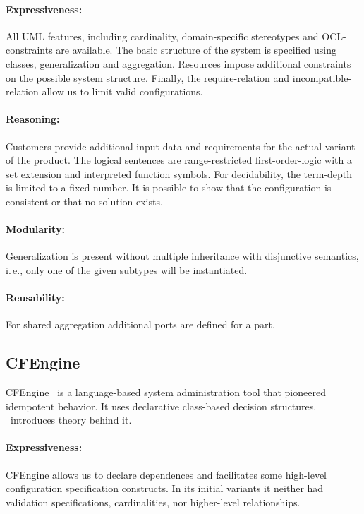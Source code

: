 \paragraph*{Expressiveness:}
All UML features, including cardinality, domain-specific stereotypes and OCL-constraints are available.
The basic structure of the system is specified using classes, generalization and aggregation.
Resources impose additional constraints on the possible system structure.
Finally, the require-relation and incompatible-relation allow us to limit valid configurations.

\paragraph*{Reasoning:}
Customers provide additional input data and requirements for the actual variant of the product.
The logical sentences are range-restricted first-order-logic with a set extension and interpreted function symbols.
For decidability, the term-depth is limited to a fixed number.
It is possible to show that the configuration is consistent or that no solution exists.

\paragraph*{Modularity:}
Generalization is present without multiple inheritance with disjunctive semantics, i.\,e., only one of the given subtypes will be instantiated.

\paragraph*{Reusability:}
For shared aggregation additional ports are defined for a part.




\subsection{CFEngine}

CFEngine~\cite{burgess1995cfengine,pandey2012investigating} is a language-based system administration tool that pioneered idempotent behavior.
It uses declarative class-based decision structures.
\citet{burgess2003theory}~introduces theory behind it.

\paragraph*{Expressiveness:}
CFEngine allows us to declare dependences and facilitates some high-level configuration specification constructs.
In its initial variants it neither had validation specifications, cardinalities, nor higher-level relationships.
